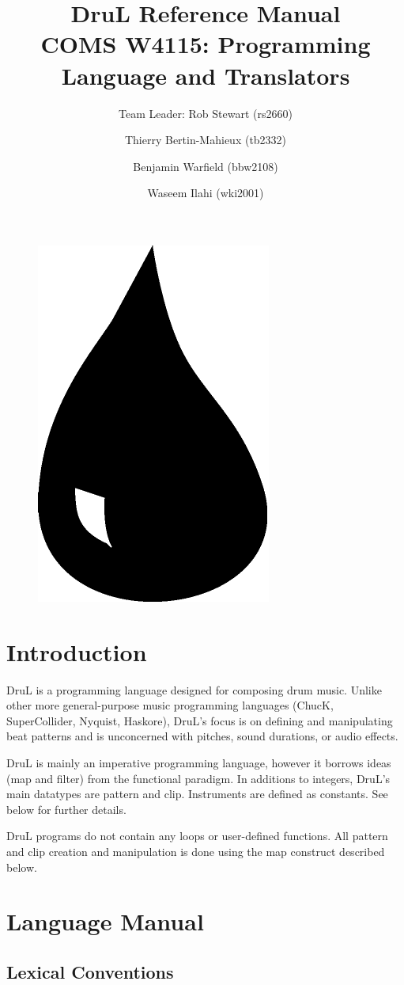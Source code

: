 \documentclass[11pt,twoside]{article}
\title{\textbf{DruL} Reference Manual\\
\vspace{1cm}
COMS W4115: Programming Language and Translators}
\author{Team Leader: Rob Stewart (rs2660) \and Thierry Bertin-Mahieux (tb2332) \and Benjamin Warfield (bbw2108) \and Waseem Ilahi (wki2001)}
\begin{document}
\maketitle
\begin{center}
\end{center}

\vspace{3cm}

\begin{figure}[h]
\begin{center}
\includegraphics[width=.2\columnwidth]{Water_Drop.pdf}
\end{center}
\end{figure}


\newpage


\section{Introduction}
DruL is a programming language designed for composing drum music.  Unlike other more general-purpose music programming languages (ChucK, SuperCollider, Nyquist, Haskore), DruL's focus is on defining and manipulating beat patterns and is unconcerned with pitches, sound durations, or audio effects.

DruL is mainly an imperative programming language, however it borrows ideas (map and filter) from the functional paradigm.  In additions to integers, DruL's main datatypes are pattern and clip. Instruments are defined as constants.  See below for further details.

DruL programs do not contain any loops or user-defined functions.  All pattern 
and clip creation and manipulation is done using the map construct described below.

\section{Language Manual}

\subsection{Lexical Conventions}
\end{document}
